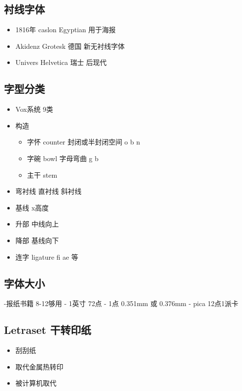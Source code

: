 \documentclass[
  letterpaper,
  DIV=11,
  numbers=noendperiod]{scrreprt}
\providecommand{\tightlist}{%
  \setlength{\itemsep}{0pt}\setlength{\parskip}{0pt}}\usepackage{longtable,booktabs,array}
\begin{document}
\subsection{衬线字体}\label{ux886cux7ebfux5b57ux4f53-1}

\begin{itemize}
\tightlist
\item
  1816年 caslon Egyptian 用于海报
\item
  Akidenz Grotesk 德国 新无衬线字体
\item
  Univers Helvetica 瑞士 后现代
\end{itemize}

\subsection{字型分类}\label{ux5b57ux578bux5206ux7c7b}

\begin{itemize}
\tightlist
\item
  Vox系统 9类
\item
  构造

  \begin{itemize}
  \tightlist
  \item
    字怀 counter 封闭或半封闭空间 o b n
  \item
    字碗 bowl 字母弯曲 g b
  \item
    主干 stem
  \end{itemize}
\item
  弯衬线 直衬线 斜衬线
\item
  基线 x高度
\item
  升部 中线向上
\item
  降部 基线向下
\item
  连字 ligature fi ae 等
\end{itemize}

\subsection{字体大小}\label{ux5b57ux4f53ux5927ux5c0f}

-报纸书籍 8-12够用 - 1英寸 72点 - 1点 0.351mm 或 0.376mm - pica
12点1派卡

\subsection{Letraset 干转印纸}\label{letraset-ux5e72ux8f6cux5370ux7eb8}

\begin{itemize}
\tightlist
\item
  刮刮纸
\item
  取代金属热转印
\item
  被计算机取代
\end{itemize}
\end{document}

